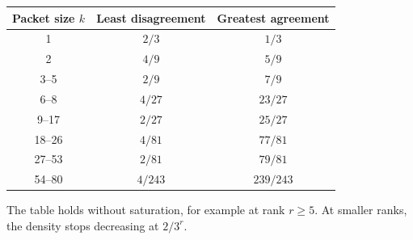 \begin{center}
\begin{tabular}{@{}ccc@{}}
\toprule
Packet size $k$ & Least disagreement & Greatest agreement\\
\midrule
1 & $2/3$ & $1/3$\\
2 & $4/9$ & $5/9$\\
3--5 & $2/9$ & $7/9$\\
6--8 & $4/27$ & $23/27$\\
9--17 & $2/27$ & $25/27$\\
18--26 & $4/81$ & $77/81$\\
27--53 & $2/81$ & $79/81$\\
54--80 & $4/243$ & $239/243$\\
\bottomrule
\end{tabular}
\end{center}
\noindent The table holds without saturation, for example at rank $r\ge5$.
At smaller ranks, the density stops decreasing at $2/3^r$.
